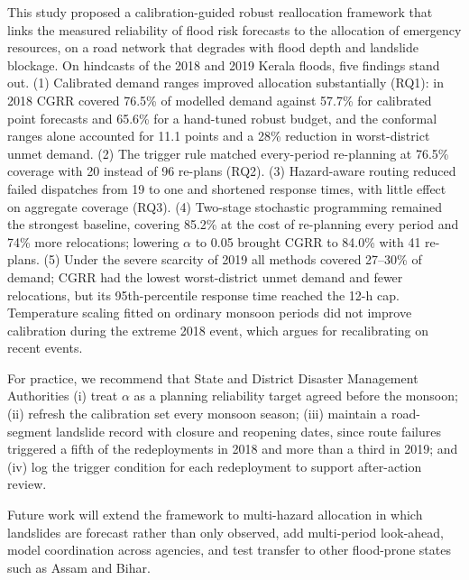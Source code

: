 \documentclass[pdflatex,sn-basic]{sn-jnl}
\theoremstyle{plain}%
\theoremstyle{remark}%
\theoremstyle{definition}%
\begin{document}
This study proposed a calibration-guided robust reallocation framework that links the measured reliability of flood risk forecasts to the allocation of emergency resources, on a road network that degrades with flood depth and landslide blockage. On hindcasts of the 2018 and 2019 Kerala floods, five findings stand out. (1) Calibrated demand ranges improved allocation substantially (RQ1): in 2018 CGRR covered 76.5\% of modelled demand against 57.7\% for calibrated point forecasts and 65.6\% for a hand-tuned robust budget, and the conformal ranges alone accounted for 11.1 points and a 28\% reduction in worst-district unmet demand. (2) The trigger rule matched every-period re-planning at 76.5\% coverage with 20 instead of 96 re-plans (RQ2). (3) Hazard-aware routing reduced failed dispatches from 19 to one and shortened response times, with little effect on aggregate coverage (RQ3). (4) Two-stage stochastic programming remained the strongest baseline, covering 85.2\% at the cost of re-planning every period and 74\% more relocations; lowering $\alpha$ to 0.05 brought CGRR to 84.0\% with 41 re-plans. (5) Under the severe scarcity of 2019 all methods covered 27--30\% of demand; CGRR had the lowest worst-district unmet demand and fewer relocations, but its 95th-percentile response time reached the 12-h cap. Temperature scaling fitted on ordinary monsoon periods did not improve calibration during the extreme 2018 event, which argues for recalibrating on recent events.

For practice, we recommend that State and District Disaster Management Authorities (i) treat $\alpha$ as a planning reliability target agreed before the monsoon; (ii) refresh the calibration set every monsoon season; (iii) maintain a road-segment landslide record with closure and reopening dates, since route failures triggered a fifth of the redeployments in 2018 and more than a third in 2019; and (iv) log the trigger condition for each redeployment to support after-action review.

Future work will extend the framework to multi-hazard allocation in which landslides are forecast rather than only observed, add multi-period look-ahead, model coordination across agencies, and test transfer to other flood-prone states such as Assam and Bihar.

\backmatter
\end{document}
